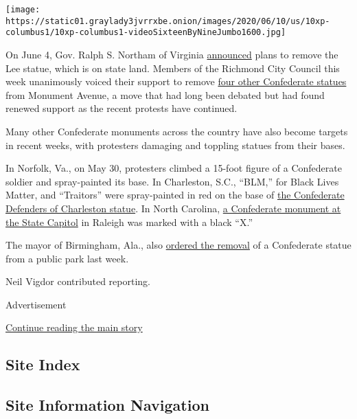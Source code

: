 \texttt{[image: https://static01.graylady3jvrrxbe.onion/images/2020/06/10/us/10xp-columbus1/10xp-columbus1-videoSixteenByNineJumbo1600.jpg]}

On June 4, Gov. Ralph S. Northam of Virginia
\href{https://www.governor.virginia.gov/newsroom/all-releases/2020/june/headline-857181-en.html}{announced}
plans to remove the Lee statue, which is on state land. Members of the
Richmond City Council this week unanimously voiced their support to
remove
\href{https://www.richmond.com/news/local/its-unanimous-all-nine-richmond-city-council-members-back-removal-of-confederate-monuments-on-monument/article_a639a9e9-6757-5278-8da5-bf498241afb9.html}{four
other Confederate statues} from Monument Avenue, a move that had long
been debated but had found renewed support as the recent protests have
continued.

Many other Confederate monuments across the country have also become
targets in recent weeks, with protesters damaging and toppling statues
from their bases.

In Norfolk, Va., on May 30, protesters climbed a 15-foot figure of a
Confederate soldier and spray-painted its base. In Charleston, S.C.,
``BLM,'' for Black Lives Matter, and ``Traitors'' were spray-painted in
red on the base of \href{https://www.hmdb.org/m.asp?m=120742}{the
Confederate Defenders of Charleston statue}. In North Carolina,
\href{https://www.ncpedia.org/monument/confederate-monument-state}{a
Confederate monument at the State Capitol} in Raleigh was marked with a
black ``X.''

The mayor of Birmingham, Ala., also
\href{https://www.nytimes3xbfgragh.onion/2020/06/02/us/george-floyd-birmingham-confederate-statue.html}{ordered
the removal} of a Confederate statue from a public park last week.

Neil Vigdor contributed reporting.

Advertisement

\protect\hyperlink{after-bottom}{Continue reading the main story}

\hypertarget{site-index}{%
\subsection{Site Index}\label{site-index}}

\hypertarget{site-information-navigation}{%
\subsection{Site Information
Navigation}\label{site-information-navigation}}

